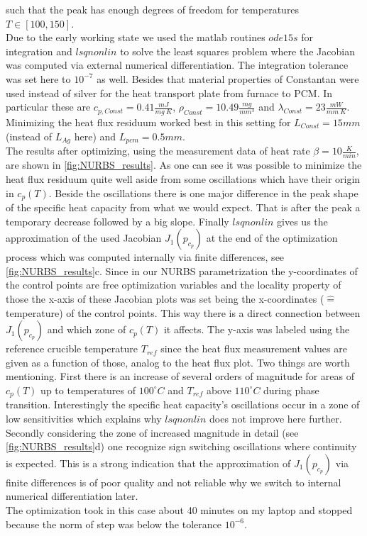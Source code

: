 \documentclass{scrartcl}[12pt, halfparskip]
\numberwithin{equation}{section}
\numberwithin{figure}{section}
\numberwithin{table}{section}
\begin{document}
such that the peak has enough degrees of freedom for temperatures $T \in [100, 150]$. \\
Due to the early working state we used the matlab routines $ode15s$ for integration and $lsqnonlin$ to solve the least squares problem where the Jacobian was computed via external numerical differentiation. The integration tolerance was set here to $10^{-7}$ as well. Besides that material properties of Constantan were used instead of silver for the heat transport plate from furnace to PCM. In particular these are $c_{p,Const}=0.41\frac{mJ}{mg \ K}$, $\rho_{Const}=10.49\frac{mg}{mm^3}$ and $\lambda_{Const}=23\frac{mW}{mm \ K}$. \\
Minimizing the heat flux residuum worked best in this setting for $L_{Const}=15mm$ (instead of $L_{Ag}$ here) and $L_{pcm}=0.5mm$. \\
The results after optimizing, using the measurement data of heat rate $\beta = 10 \frac{K}{min}$, are shown in \cref{fig:NURBS_results}. As one can see it was possible to minimize the heat flux residuum quite well aside from some oscillations which have their origin in $c_p(T)$. 
Beside the oscillations there is one major difference in the peak shape of the specific heat capacity from what we would expect. That is after the peak a temporary decrease followed by a big slope.
Finally $lsqnonlin$ gives us the approximation of the used Jacobian $J_1(p_{c_p})$ at the end of the optimization process which was computed internally via finite differences, see \cref{fig:NURBS_results}c. Since in our NURBS parametrization the y-coordinates of the control points are free optimization variables and the locality property of those the x-axis of these Jacobian plots was set being the x-coordinates ($\hat{=}$ temperature) of the control points. This way there is a direct connection between $J_1(p_{c_p})$ and which zone of $c_p(T)$ it affects. The y-axis was labeled using the reference crucible temperature $T_{ref}$ since the heat flux measurement values are given as a function of those, analog to the heat flux plot.
Two things are worth mentioning. First there is an increase of several orders of magnitude for areas of $c_p(T)$ up to temperatures of $100^\circ C$ and $T_{ref}$ above $110^\circ C$ during phase transition. Interestingly the specific heat capacity's oscillations occur in a zone of low sensitivities which explains why $lsqnonlin$ does not improve here further. 
Secondly considering the zone of increased magnitude in detail (see \cref{fig:NURBS_results}d) one recognize sign switching oscillations where continuity is expected. This is a strong indication that the approximation of $J_1(p_{c_p})$ via finite differences is of poor quality and not reliable why we switch to internal numerical differentiation later. \\
The optimization took in this case about 40 minutes on my laptop and stopped because the norm of step was below the tolerance $10^{-6}$.
\end{document}
